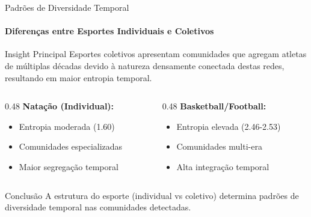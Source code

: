 \begin{frame}{Padrões de Diversidade Temporal}
    \framesubtitle{Diferenças entre Esportes Individuais e Coletivos}
    \begin{alertblock}{Insight Principal}
        \footnotesize
        Esportes coletivos apresentam comunidades que agregam atletas de múltiplas décadas devido à natureza densamente conectada destas redes, resultando em maior entropia temporal.
    \end{alertblock}

    \vspace{0.2cm}
    \begin{columns}[T]
        \begin{column}{0.48\textwidth}
            \textbf{Natação (Individual):}
            \begin{itemize}
                \footnotesize
                \item Entropia moderada (1.60)
                \item Comunidades especializadas
                \item Maior segregação temporal
            \end{itemize}
        \end{column}
        \begin{column}{0.48\textwidth}
            \textbf{Basketball/Football:}
            \begin{itemize}
                \footnotesize
                \item Entropia elevada (2.46-2.53)
                \item Comunidades multi-era
                \item Alta integração temporal
            \end{itemize}
        \end{column}
    \end{columns}

    \vspace{0.2cm}
    \begin{block}{Conclusão}
        \footnotesize
        A estrutura do esporte (individual vs coletivo) determina padrões de diversidade temporal nas comunidades detectadas.
    \end{block}
\end{frame}
